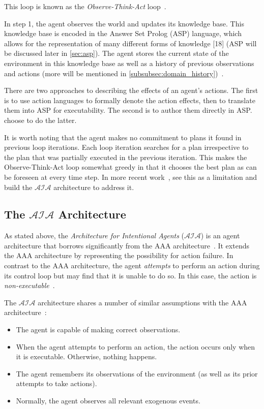 This loop is known as the \textit{Observe-Think-Act} loop~\citep{balduccini_aaa_2008}.

In step 1, the agent observes the world and updates its knowledge base.
This knowledge base is encoded in the Answer Set Prolog (ASP) language, which allows for the representation of many different forms of knowledge [18] (ASP will be discussed later in \cref{sec:asp}).
The agent stores the current state of the environment in this knowledge base as well as a history of previous observations and actions (more will be mentioned in \cref{subsubsec:domain_history})~\citep{balduccini_aaa_2008}.

There are two approaches to describing the effects of an agent's actions.
The first is to use action languages to formally denote the action effects, then to translate them into ASP for executability.
The second is to author them directly in ASP.
\citet{balduccini_aaa_2008} choose to do the latter.

It is worth noting that the agent makes no commitment to plans it found in previous loop iterations.
Each loop iteration searches for a plan irrespective to the plan that was partially executed in the previous iteration.
This makes the Observe-Think-Act loop somewhat greedy in that it chooses the best plan as can be foreseen at every time step.
In more recent work~\citep{blount_towards_2014}, \citeauthor{blount_towards_2014} see this as a limitation and build the $\mathcal{AIA}$ architecture to address it.

\subsection{The $\mathcal{AIA}$ Architecture}
\label{subsec:aia_architecture}

As stated above, the \textit{Architecture for Intentional Agents} ($\mathcal{AIA}$) is an agent architecture that borrows significantly from the AAA architecture~\citep{blount_towards_2014}.
It extends the AAA architecture by representing the possibility for action failure.
In contrast to the AAA architecture, the agent \textit{attempts} to perform an action during its control loop but may find that it is unable to do so.
In this case, the action is \textit{non-executable}~\citep{blount_towards_2014}.

The $\mathcal{AIA}$ architecture shares a number of similar assumptions with the AAA architecture~\citep{blount_towards_2014}:

\begin{itemize}
    \item The agent is capable of making correct observations.
    \item When the agent attempts to perform an action, the action occurs only when it is executable.
        Otherwise, nothing happens.
    \item The agent remembers its observations of the environment (as well as its prior attempts to take actions).
    \item Normally, the agent observes all relevant exogenous events.
\end{itemize}

